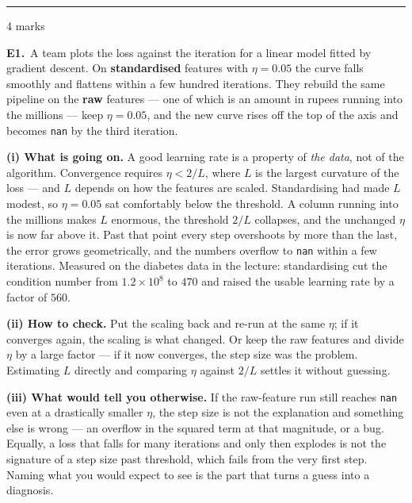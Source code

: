 \documentclass[10pt,a4paper]{article}
\newcommand{\parthead}[2]{\vspace{2pt}\noindent\rule{\linewidth}{0.4pt}\par\vspace{2pt}%
  \noindent{\bfseries Part #1}\hfill{\small #2}\par\vspace{1pt}}
\begin{document}
\newpage

\parthead{E --- Reasoning}{4 marks}

\textbf{E1.}\ A team plots the loss against the iteration for a linear model fitted by gradient descent. On
\textbf{standardised} features with $\eta = 0.05$ the curve falls smoothly and flattens within a few hundred
iterations. They rebuild the same pipeline on the \textbf{raw} features --- one of which is an amount in
rupees running into the millions --- keep $\eta = 0.05$, and the new curve rises off the top of the axis and
becomes \texttt{nan} by the third iteration.

\vspace{4pt}

\textbf{(i) What is going on.} A good learning rate is a property of \emph{the data}, not of the algorithm. Convergence requires $\eta < 2/L$, where $L$ is the largest curvature of the loss --- and $L$ depends on how the features are scaled. Standardising had made $L$ modest, so $\eta = 0.05$ sat comfortably below the threshold. A column running into the millions makes $L$ enormous, the threshold $2/L$ collapses, and the unchanged $\eta$ is now far above it. Past that point every step overshoots by more than the last, the error grows geometrically, and the numbers overflow to \texttt{nan} within a few iterations. Measured on the diabetes data in the lecture: standardising cut the condition number from $1.2 \times 10^{8}$ to $470$ and raised the usable learning rate by a factor of $560$.\par\vspace{1mm}\textbf{(ii) How to check.} Put the scaling back and re-run at the same $\eta$; if it converges again, the scaling is what changed. Or keep the raw features and divide $\eta$ by a large factor --- if it now converges, the step size was the problem. Estimating $L$ directly and comparing $\eta$ against $2/L$ settles it without guessing.\par\vspace{1mm}\textbf{(iii) What would tell you otherwise.} If the raw-feature run still reaches \texttt{nan} even at a drastically smaller $\eta$, the step size is not the explanation and something else is wrong --- an overflow in the squared term at that magnitude, or a bug. Equally, a loss that falls for many iterations and only then explodes is not the signature of a step size past threshold, which fails from the very first step. Naming what you would expect to see is the part that turns a guess into a diagnosis.
\end{document}
